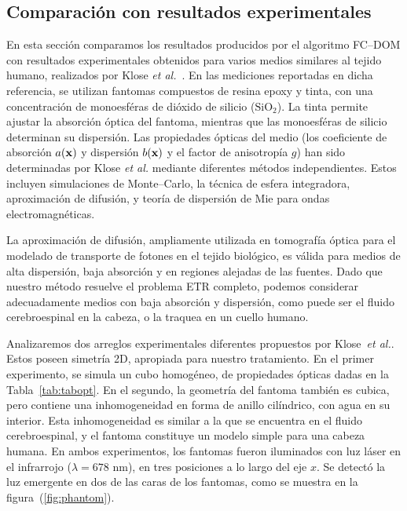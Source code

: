 \subsection{Comparación con resultados experimentales}
\label{sec:resexp}

En esta sección comparamos los resultados producidos por el algoritmo FC--DOM 
con resultados experimentales obtenidos para varios 
medios similares al tejido humano, realizados por Klose \textit{et al.}~\cite{Klose2002}. 
En las mediciones reportadas en dicha referencia, 
se utilizan fantomas compuestos de resina epoxy y tinta, 
con una concentración de monoesféras de dióxido de silicio ($\text{SiO}_2$). 
La tinta permite ajustar la absorción óptica del fantoma, 
mientras que las monoesféras de silicio determinan su dispersión. 
Las propiedades ópticas del medio (los coeficiente de absorción $a(\mathbf{x})$
y dispersión $b(\mathbf{x})$ y el 
factor de anisotropía $g$) han sido determinadas por Klose \textit{et al.} mediante 
diferentes métodos independientes. Estos incluyen simulaciones de Monte--Carlo, 
la técnica de esfera integradora, aproximación de difusión, y teoría de 
dispersión de Mie para ondas electromagnéticas. 

La aproximación de difusión, ampliamente utilizada en tomografía óptica para el 
modelado de transporte de fotones en el tejido biológico, 
es válida para medios de alta dispersión,  
baja absorción y en regiones alejadas de las fuentes.
Dado que nuestro método resuelve el problema ETR completo, podemos considerar adecuadamente 
medios con baja absorción y dispersión, como puede ser el fluido cerebroespinal 
en la cabeza, o la traquea en un cuello humano. 

Analizaremos dos arreglos experimentales diferentes propuestos por Klose~\textit{et al.}. 
Estos poseen simetría 2D, apropiada para nuestro tratamiento. 
 En el primer experimento, se simula un cubo homogéneo, de propiedades ópticas dadas en 
 la Tabla~\ref{tab:tabopt}.
 En el segundo, la geometría del fantoma también 
 es cubica, pero contiene una inhomogeneidad en forma 
 de anillo cilíndrico, con agua en su interior. Esta inhomogeneidad 
 es similar a la que se encuentra en 
 el fluido cerebroespinal, y el fantoma constituye un modelo 
 simple para una cabeza humana. En ambos experimentos,
los fantomas fueron iluminados con luz láser en el 
infrarrojo ($\lambda = 678$ nm), en tres posiciones a lo largo del eje $x$. Se detectó la luz emergente 
en dos de las caras de los fantomas, como se muestra en la figura~(\ref{fig:phantom}).

